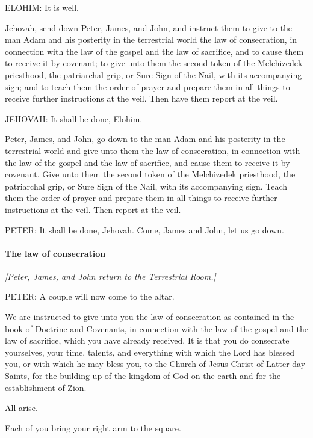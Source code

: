 				ELOHIM: It is well.

				Jehovah, send down Peter, James, and John, and instruct them to give to the man Adam and his posterity in the terrestrial world the law of consecration, in connection with the law of the gospel and the law of sacrifice, and to cause them to receive it by covenant; to give unto them the second token of the Melchizedek priesthood, the patriarchal grip, or Sure Sign of the Nail, with its accompanying sign; and to teach them the order of prayer and prepare them in all things to receive further instructions at the veil. Then have them report at the veil.

				JEHOVAH: It shall be done, Elohim.

				Peter, James, and John, go down to the man Adam and his posterity in the terrestrial world and give unto them the law of consecration, in connection with the law of the gospel and the law of sacrifice, and cause them to receive it by covenant. Give unto them the second token of the Melchizedek priesthood, the patriarchal grip, or Sure Sign of the Nail, with its accompanying sign. Teach them the order of prayer and prepare them in all things to receive further instructions at the veil. Then report at the veil.

				PETER: It shall be done, Jehovah. Come, James and John, let us go down.
				
			\paragraph{The law of consecration}
				\label{TEMPLE-ENDOWMENT-ENDOW-PRE-1990-CONSECRATION}
				
				\textit{[Peter, James, and John return to the Terrestrial Room.]}

				PETER: A couple will now come to the altar.

				We are instructed to give unto you the law of consecration as contained in the book of Doctrine and Covenants, in connection with the law of the gospel and the law of sacrifice, which you have already received. It is that you do consecrate yourselves, your time, talents, and everything with which the Lord has blessed you, or with which he may bless you, to the Church of Jesus Christ of Latter-day Saints, for the building up of the kingdom of God on the earth and for the establishment of Zion.

				All arise.

				Each of you bring your right arm to the square.

